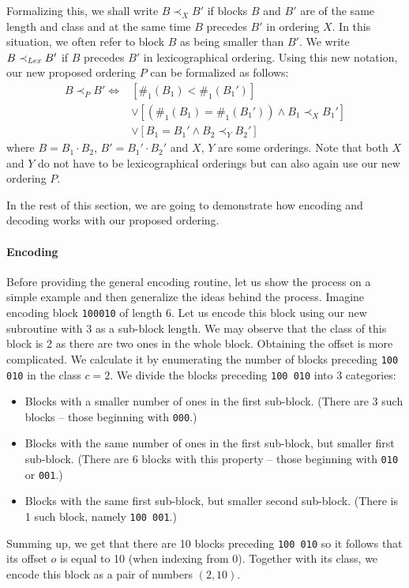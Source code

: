 Formalizing this, we shall write $B\prec_X B'$ if blocks $B$ and $B'$ are of
the same length and class and at the same time $B$ precedes $B'$ in ordering $X$.
In this situation, we often refer to block $B$ as being smaller than $B'$.
We write $B\prec_{\mathit{Lex}} B'$ if $B$ precedes $B'$ in lexicographical ordering.
Using this new notation, our new proposed ordering $P$ can be formalized as follows:
\begin{align*}
    B\prec_P B' \iff
    &[\#_1(B_1) < \#_1(B_1')] \\
    &\lor [(\#_1(B_1) = \#_1(B_1')) \land B_1 \prec_{X} B_1']\\
    &\lor [B_1 = B_1' \land B_2 \prec_{Y} B_2']
\end{align*}
where $B=B_1\cdot B_2$, $B'=B_1'\cdot B_2'$ and $X$, $Y$ are some orderings. Note that
both $X$ and $Y$ do not have to be lexicographical orderings but can also again
use our new ordering $P$.

In the rest of this section, we are going to demonstrate how encoding and decoding works
with our proposed ordering.

\paragraph{Encoding}

Before providing the general encoding routine, let us show the process on
a simple example and then generalize the ideas behind the process. Imagine
encoding block {\tt 100010} of length 6. Let us encode this block using our new
subroutine with 3 as a sub-block length. We may observe that the class of this
block is 2 as there are two ones in the whole block. Obtaining the offset is
more complicated. We calculate it by enumerating the number of blocks preceding
{\tt 100 010} in the class $c=2$. We divide the blocks preceding {\tt 100 010}
into 3 categories:
\begin{itemize}
    \item Blocks with a smaller number of ones in the first sub-block.
    (There are 3 such blocks -- those beginning with {\tt 000}.)
    \item Blocks with the same number of ones in the first sub-block, but smaller first sub-block.
    (There are 6 blocks with this property -- those beginning with {\tt 010} or {\tt 001}.)
    \item Blocks with the same first sub-block, but smaller second sub-block.
    (There is 1 such block, namely {\tt 100 001}.)
\end{itemize}
Summing up, we get that there are 10 blocks preceding {\tt 100 010} so it follows
that its offset $o$ is equal to 10 (when indexing from 0). Together with its class,
we encode this block as a pair of numbers $(2, 10)$.

